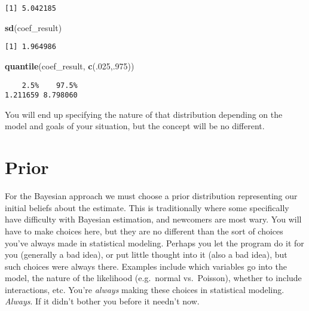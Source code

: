 \documentclass[]{book}
\newenvironment{Shaded}{\begin{snugshade}}{\end{snugshade}}
\newcommand{\KeywordTok}[1]{\textcolor[rgb]{0.13,0.29,0.53}{\textbf{{#1}}}}
\newcommand{\DecValTok}[1]{\textcolor[rgb]{0.00,0.00,0.81}{{#1}}}
\newcommand{\NormalTok}[1]{{#1}}
\begin{document}
\begin{verbatim}
[1] 5.042185
\end{verbatim}

\begin{Shaded}
\begin{Highlighting}[]
\KeywordTok{sd}\NormalTok{(coef_result)}
\end{Highlighting}
\end{Shaded}

\begin{verbatim}
[1] 1.964986
\end{verbatim}

\begin{Shaded}
\begin{Highlighting}[]
\KeywordTok{quantile}\NormalTok{(coef_result, }\KeywordTok{c}\NormalTok{(.}\DecValTok{025}\NormalTok{,.}\DecValTok{975}\NormalTok{))}
\end{Highlighting}
\end{Shaded}

\begin{verbatim}
    2.5%    97.5% 
1.211659 8.798060 
\end{verbatim}

You will end up specifying the nature of that distribution depending on
the model and goals of your situation, but the concept will be no
different.

\section{Prior}\label{prior}

For the Bayesian approach we must choose a {prior distribution}
representing our initial beliefs about the estimate. This is
traditionally where some specifically have difficulty with Bayesian
estimation, and newcomers are most wary. You will have to make choices
here, but they are no different than the sort of choices you've always
made in statistical modeling. Perhaps you let the program do it for you
(generally a bad idea), or put little thought into it (also a bad idea),
but such choices were always there. Examples include which variables go
into the model, the nature of the likelihood (e.g.~normal vs.~Poisson),
whether to include interactions, etc. You're \emph{always} making these
choices in statistical modeling. \emph{Always}. If it didn't bother you
before it needn't now.
\end{document}
